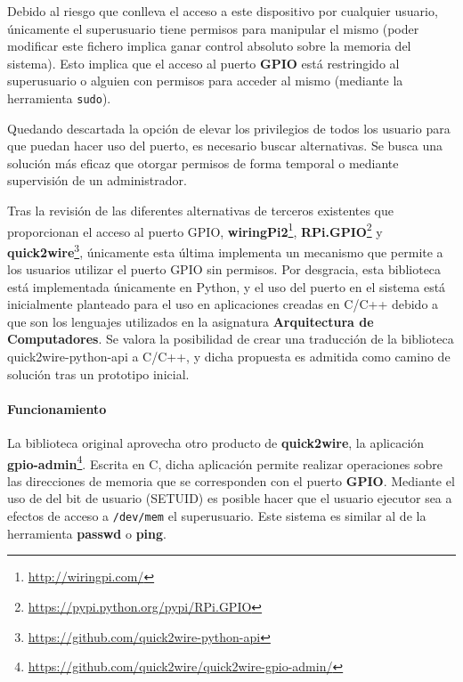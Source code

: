 Debido al riesgo que conlleva el acceso a este dispositivo por cualquier usuario, únicamente el superusuario tiene permisos para manipular el mismo (poder modificar este fichero implica ganar control absoluto sobre la memoria del sistema). Esto implica que el acceso al puerto \textbf{GPIO} está restringido al superusuario o alguien con permisos para acceder al mismo (mediante la herramienta \texttt{sudo}).

Quedando descartada la opción de elevar los privilegios de todos los usuario para que puedan hacer uso del puerto, es necesario buscar alternativas. Se busca una solución más eficaz que otorgar permisos de forma temporal o mediante supervisión de un administrador.

Tras la revisión de las diferentes alternativas de terceros existentes que proporcionan el acceso al puerto GPIO, \textbf{wiringPi2}\footnote{\href{http://wiringpi.com/}{http://wiringpi.com/}}, \textbf{RPi.GPIO}\footnote{\href{https://pypi.python.org/pypi/RPi.GPIO}{https://pypi.python.org/pypi/RPi.GPIO}} y \textbf{quick2wire}\footnote{\href{https://github.com/quick2wire-python-api}{https://github.com/quick2wire-python-api}}, únicamente esta última implementa un mecanismo que permite a los usuarios utilizar el puerto GPIO sin permisos. Por desgracia, esta biblioteca está implementada únicamente en Python, y el uso del puerto en el sistema está inicialmente planteado para el uso en aplicaciones creadas en C/C++ debido a que son los lenguajes utilizados en la asignatura \textbf{Arquitectura de Computadores}. Se valora la posibilidad de crear una traducción de la biblioteca quick2wire-python-api a C/C++, y dicha propuesta es admitida como camino de solución tras un prototipo inicial.

\paragraph{Funcionamiento}

La biblioteca original aprovecha otro producto de \textbf{quick2wire}, la aplicación \textbf{gpio-admin}\footnote{\href{https://github.com/quick2wire/quick2wire-gpio-admin/}{https://github.com/quick2wire/quick2wire-gpio-admin/}}. Escrita en C, dicha aplicación permite realizar operaciones sobre las direcciones de memoria que se corresponden con el puerto \textbf{GPIO}. Mediante el uso de del bit de usuario (SETUID) es posible hacer que el usuario ejecutor sea a efectos de acceso a \texttt{/dev/mem} el superusuario. Este sistema es similar al de la herramienta \textbf{passwd} o \textbf{ping}.

